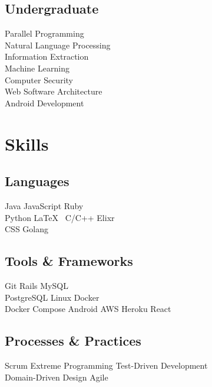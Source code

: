 \documentclass[]{deedy-resume-openfont}
\begin{document}
\begin{minipage}[t]{0.33\textwidth}
\subsection{Undergraduate}
Parallel Programming \\
Natural Language Processing \\
Information Extraction \\
Machine Learning \\
Computer Security \\
Web Software Architecture \\
Android Development \\
\sectionsep


\section{Skills}
\subsection{Languages}
Java \textbullet{}  JavaScript \textbullet{} Ruby \textbullet{} \\
Python \textbullet{} \LaTeX\ \textbullet{} C/C++ \textbullet{} Elixr \textbullet{} \\
CSS \textbullet{} Golang \\
\sectionsep

\subsection{Tools \& Frameworks}
Git \textbullet{} Rails \textbullet{} MySQL \textbullet{} \\
PostgreSQL \textbullet{} Linux \textbullet{} Docker \textbullet{} \\ 
Docker Compose \textbullet{} Android \textbullet{} AWS \textbullet{} Heroku \textbullet{} 
React \\
\sectionsep

\subsection{Processes \& Practices}
Scrum \textbullet{} Extreme Programming \textbullet{} Test-Driven Development \textbullet{} \\
Domain-Driven Design \textbullet{} Agile \\
\sectionsep

%
%

\end{minipage} 
\end{document}
